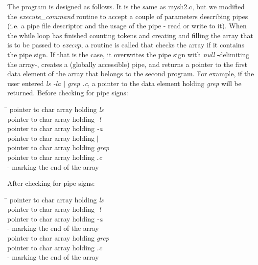 \documentclass[a4paper,10pt]{article}
\begin{document}
The program is designed as follows. It is the same as mysh2.c, but we modified the \emph{execute\_command} routine to accept a couple of parameters describing pipes (i.e. a pipe file descriptor and the usage of the pipe - read or write to it). When the while loop has finished counting tokens and creating and filling the array that is to be passed to \emph{execvp}, a routine is called that checks the array if it contains the pipe sign. If that is the case, it overwrites the pipe sign with \emph{null} -delimiting the array-, creates a (globally accessible) pipe, and returns a pointer to the first data element of the array that belongs to the second program. For example, if the user entered \emph{ls -la $\mid$ grep .c}, a pointer to the data element holding \emph{grep} will be returned. Before checking for pipe signs:
\begin{tabbing}
\hspace{20pt}\=\kill
 \> [0] pointer to char array holding \emph{ls}\\ 
 \> [1] pointer to char array holding \emph{-l}\\
 \> [2] pointer to char array holding \emph{-a}\\
 \> [3] pointer to char array holding \emph{$\mid$}\\ 
 \> [4] pointer to char array holding \emph{grep}\\
 \> [5] pointer to char array holding \emph{.c}\\
  - marking the end of the array
\end{tabbing}
After checking for pipe signs:
\begin{tabbing}
\hspace{20pt}\=\kill
 \> [0] pointer to char array holding \emph{ls}\\ 
 \> [1] pointer to char array holding \emph{-l}\\
 \> [2] pointer to char array holding \emph{-a}\\
  - marking the end of the array\\ 
 \> [4] pointer to char array holding \emph{grep}\\
 \> [5] pointer to char array holding \emph{.c}\\
  - marking the end of the array
\end{tabbing}
\end{document}
